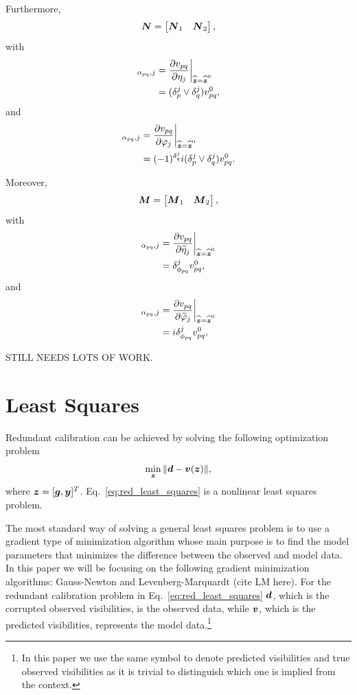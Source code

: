 \documentclass[useAMS,usenatbib]{mn2e}
\newcommand{\bz}{\bmath{z}}
\newcommand{\bg}{\bmath{g}}
\newcommand{\bd}{\bmath{d}}
\newcommand{\bv}{\bmath{v}}
\newcommand{\by}{\bmath{y}}
\newcommand{\bN}{\bmath{N}}
\newcommand{\bM}{\bmath{M}}
\begin{document}
Furthermore, 
\begin{equation}
\bN = \begin{bmatrix}
      \bN_1 & \bN_2 
      \end{bmatrix},
\end{equation}
with 
\begin{align}
[\bN_1]_{\alpha_{pq},j} &= \frac{\partial v_{pq}}{\partial \eta_j} {\bigg |}_{\widehat{\bz}=\widehat{\bz}^0}\\
&= (\delta_{p}^{j}\vee\delta_{q}^{j}) v_{pq}^0,
\end{align}
and
\begin{align}
 [\bN_2]_{\alpha_{pq},j} &= \frac{\partial v_{pq}}{\partial \varphi_j} {\bigg |}_{\widehat{\bz}=\widehat{\bz}^0}\\
 &= (-1)^{\delta_{q}^{j}}i(\delta_{p}^{j}\vee\delta_{q}^{j}) v_{pq}^0. 
\end{align}

Moreover,
\begin{equation}
\bM = \begin{bmatrix}
      \bM_1 & \bM_2 
      \end{bmatrix},
\end{equation}
with
\begin{align}
[\bM_1]_{\alpha_{pq},j} &= \frac{\partial v_{pq}}{\partial \widetilde{\eta}_j} {\bigg |}_{\widehat{\bz}=\widehat{\bz}^0}\\
&=  \delta_{\phi_{pq}}^{j} v_{pq}^0,
\end{align}
and
\begin{align}
[\bM_2]_{\alpha_{pq},j} &= \frac{\partial v_{pq}}{\partial \widetilde{\varphi}_j} {\bigg |}_{\widehat{\bz}=\widehat{\bz}^0}\\
&= i\delta_{\phi_{pq}}^{j} v_{pq}^0,
\end{align}

STILL NEEDS LOTS OF WORK.

\section{Least Squares}
Redundant calibration can be achieved by solving the following optimization problem
\begin{equation}
\label{eq:red_least_squares}
\min_{\bz} \|\bd - \bv(\bz)\|, 
\end{equation}
where $\bz = [\bg,\by]^T$. Eq.~\eqref{eq:red_least_squares} is a nonlinear least squares problem.

The most standard way of solving a general least squares problem is to use a gradient type of minimization algorithm whose main purpose is to find the model parameters that 
minimizes the difference between the observed and model data. In this paper we will be focusing on the following gradient minimization algorithms: Gauss-Newton and Levenberg-Marquardt (cite LM here). For the redundant calibration problem in Eq.~\eqref{eq:red_least_squares} $\bd$, which is the corrupted observed visibilities, is the observed data,
while $\bv$, which is the predicted visibilities, represents the model data.\footnote{In this paper we use the same symbol to denote predicted visibilities and true observed visibilities as it
is trivial to distinguish which one is implied from the context.}   
\end{document}
